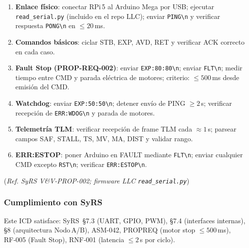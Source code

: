 \begin{enumerate}
  \item \textbf{Enlace físico}: conectar RPi\,5 al Arduino Mega por USB;
        ejecutar \texttt{read\_serial.py} (incluido en el repo LLC);
        enviar \verb|PING\n| y verificar respuesta \verb|PONG\n| en $\leq 20$\,ms.
  \item \textbf{Comandos básicos}: ciclar STB, EXP, AVD, RET y verificar
        ACK correcto en cada caso.
  \item \textbf{Fault Stop (PROP-REQ-002)}: enviar \verb|EXP:80:80\n|;
        enviar \verb|FLT\n|; medir tiempo entre CMD y parada eléctrica
        de motores; criterio: $\leq 500$\,ms desde emisión del CMD.
  \item \textbf{Watchdog}: enviar \verb|EXP:50:50\n|; detener envío de PING
        $\geq 2$\,s; verificar recepción de \verb|ERR:WDOG\n| y parada de motores.
  \item \textbf{Telemetría TLM}: verificar recepción de frame TLM cada $\approx 1$\,s;
        parsear campos SAF, STALL, TS, MV, MA, DIST y validar rango.
  \item \textbf{ERR:ESTOP}: poner Arduino en FAULT mediante \verb|FLT\n|;
        enviar cualquier CMD excepto \verb|RST\n|; verificar \verb|ERR:ESTOP\n|.
\end{enumerate}
(\emph{Ref. SyRS V\&V-PROP-002; firmware LLC \texttt{read\_serial.py}})

\subsubsection{Cumplimiento con SyRS}

Este ICD satisface:
SyRS~§7.3 (UART, GPIO, PWM), §7.4 (interfaces internas),
§8 (arquitectura Nodo\,A/B), ASM-042,
PROP\-REQ (motor stop $\leq 500$\,ms),
RF‑005 (Fault Stop), RNF‑001 (latencia $\leq 2$\,s por ciclo).%
